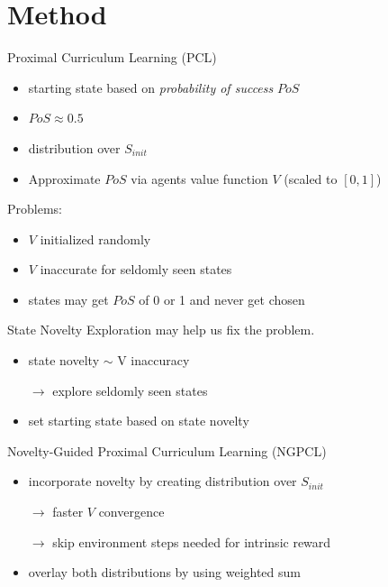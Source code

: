 \documentclass[aspectratio=169]{beamer}
\begin{document}
\section{Method}
\begin{frame}{Proximal Curriculum Learning (PCL)~\parencite{prox_curr}}
  \begin{itemize}
    \item starting state based on \textit{probability of success} $PoS$
    \item $PoS \approx 0.5$
    \item distribution over $S_{init}$
    \item Approximate $PoS$ via agents value function $V$ (scaled to $[0, 1]$)
  \end{itemize}
  \vfill
  \pause
  Problems:
  \begin{itemize}
    \item $V$ initialized randomly
    \item $V$ inaccurate for seldomly seen states
    \item states may get $PoS$ of 0 or 1 and never get chosen
  \end{itemize}
\end{frame}

\begin{frame}{State Novelty}
  Exploration may help us fix the problem.
  \begin{itemize}
    \item state novelty $\sim$ V inaccuracy
    \item[$\rightarrow$] explore seldomly seen states
    \item set starting state based on state novelty
  \end{itemize}
\end{frame}

\begin{frame}{Novelty-Guided Proximal Curriculum Learning (NGPCL)}
  \begin{itemize}
    \item incorporate novelty by creating distribution over $S_{init}$
    \item[$\rightarrow$] faster $V$ convergence
    \item[$\rightarrow$] skip environment steps needed for intrinsic reward
    \item overlay both distributions by using weighted sum
  \end{itemize}
\end{frame}
\end{document}
